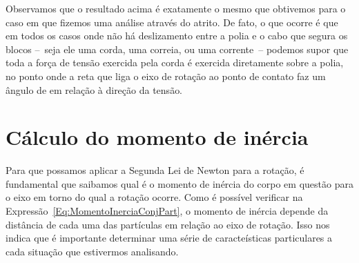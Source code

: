 Observamos que o resultado acima é exatamente o mesmo que obtivemos para o caso em que fizemos uma análise através do atrito. De fato, o que ocorre é que em todos os casos onde não há deslizamento entre a polia e o cabo que segura os blocos --~seja ele uma corda, uma correia, ou uma corrente~-- podemos supor que toda a força de tensão exercida pela corda é exercida diretamente sobre a polia, no ponto onde a reta que liga o eixo de rotação ao ponto de contato faz um ângulo de  em relação à direção da tensão.


\section{Cálculo do momento de inércia}

Para que possamos aplicar a Segunda Lei de Newton para a rotação, é fundamental que saibamos qual é o momento de inércia do corpo em questão para o eixo em torno do qual a rotação ocorre. Como é possível verificar na Expressão~\ref{Eq:MomentoInerciaConjPart}, o momento de inércia depende da distância de cada uma das partículas em relação ao eixo de rotação. Isso nos indica que é importante determinar uma série de caracteísticas particulares a cada situação que estivermos analisando.

